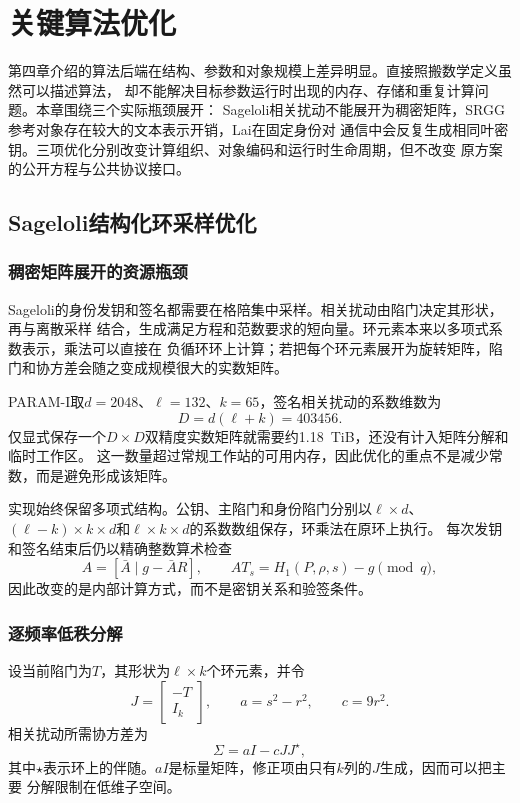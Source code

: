 \chapter{关键算法优化}

第四章介绍的算法后端在结构、参数和对象规模上差异明显。直接照搬数学定义虽然可以描述算法，
却不能解决目标参数运行时出现的内存、存储和重复计算问题。本章围绕三个实际瓶颈展开：
Sageloli相关扰动不能展开为稠密矩阵，SRGG参考对象存在较大的文本表示开销，Lai在固定身份对
通信中会反复生成相同叶密钥。三项优化分别改变计算组织、对象编码和运行时生命周期，但不改变
原方案的公开方程与公共协议接口。

\section{Sageloli结构化环采样优化}

\subsection{稠密矩阵展开的资源瓶颈}

Sageloli的身份发钥和签名都需要在格陪集中采样。相关扰动由陷门决定其形状，再与离散采样
结合，生成满足方程和范数要求的短向量。环元素本来以多项式系数表示，乘法可以直接在
负循环环上计算；若把每个环元素展开为旋转矩阵，陷门和协方差会随之变成规模很大的实数矩阵。

PARAM-I取$d=2048$、$\ell=132$、$k=65$，签名相关扰动的系数维数为
\[
 D=d(\ell+k)=403456.
\]
仅显式保存一个$D\times D$双精度实数矩阵就需要约1.18~TiB，还没有计入矩阵分解和临时工作区。
这一数量超过常规工作站的可用内存，因此优化的重点不是减少常数，而是避免形成该矩阵。

实现始终保留多项式结构。公钥、主陷门和身份陷门分别以$\ell\times d$、
$(\ell-k)\times k\times d$和$\ell\times k\times d$的系数数组保存，环乘法在原环上执行。
每次发钥和签名结束后仍以精确整数算术检查
\[
 A=[\bar A\mid g-\bar AR],\qquad
 AT_s=H_1(P,\rho,s)-g\pmod q,
\]
因此改变的是内部计算方式，而不是密钥关系和验签条件。

\subsection{逐频率低秩分解}

设当前陷门为$T$，其形状为$\ell\times k$个环元素，并令
\[
 J=\begin{bmatrix}-T\\I_k\end{bmatrix},\qquad
 a=s^2-r^2,\qquad c=9r^2.
\]
相关扰动所需协方差为
\[
 \Sigma=aI-cJJ^\star,
\]
其中$\star$表示环上的伴随。$aI$是标量矩阵，修正项由只有$k$列的$J$生成，因而可以把主要
分解限制在低维子空间。

